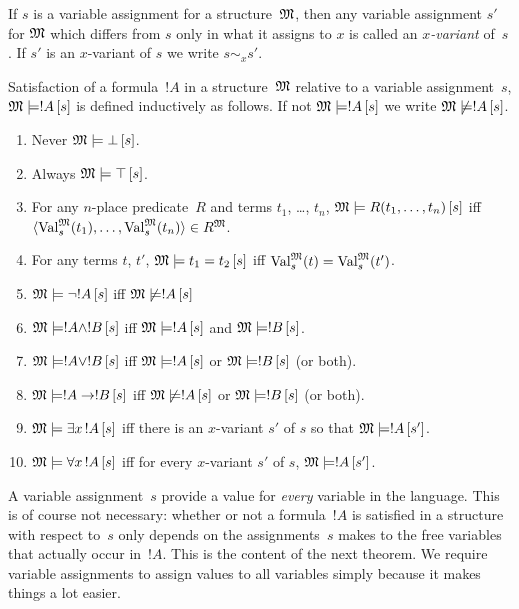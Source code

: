\documentclass[open-logic-section]{subfiles}
\begin{document}
\begin{defn}[$x$-Variant]
If $s$ is a variable assignment for a structure~$\mathfrak M$, then any
variable assignment $s'$ for $\mathfrak M$ which differs from $s$ only
in what it assigns to $x$ is called an \emph{$x$-variant} of~$s$.  If
$s'$ is an $x$-variant of $s$ we write $s \sim_x s'$.
\end{defn}

\begin{defn}[Satisfaction]
Satisfaction of a formula~$!A$ in a structure~$\mathfrak M$ relative to
a variable assignment~$s$, $\Sat{M}{!A}[s]$ is defined inductively as
follows. If not $\Sat{M}{!A}[s]$ we write $\Sat/{M}{!A}[s]$.
\begin{enumerate}
\item Never $\Sat{M}{\lfalse}[s]$.
\item Always $\Sat{M}{\ltrue}[s]$.
\item For any $n$-place predicate~$R$ and terms $t_1$, \dots, $t_n$,
  $\Sat{M}{\Atom{R}{t_1, \dots, t_n}}[s]$ iff $\langle \Value{t_1}{M}[s],
  \dots, \Value{t_n}{M}[s] \rangle \in \Assign{R}{M}$.
\item For any terms $t$, $t'$, $\Sat{M}{t_1 = t_2}[s]$ iff
  $\Value{t}{M}[s] = \Value{t'}{M}[s]$.
\item $\Sat{M}{\lnot !A}[s]$ iff $\Sat/{M}{!A}[s]$
\item $\Sat{M}{!A \land !B}[s]$ iff $\Sat{M}{!A}[s]$ and $\Sat{M}{!B}[s]$.
\item $\Sat{M}{!A \lor !B}[s]$ iff $\Sat{M}{!A}[s]$ or
  $\Sat{M}{!B}[s]$ (or both).
\item $\Sat{M}{!A \lif !B}[s]$ iff $\Sat/{M}{!A}[s]$ or
  $\Sat{M}{!B}[s]$ (or both).
\item $\Sat{M}{\lexists[x][!A]}[s]$ iff there is an $x$-variant $s'$
  of $s$ so that $\Sat{M}{!A}[s']$.
\item $\Sat{M}{\lforall[x][!A]}[s]$ iff for every $x$-variant $s'$ of
  $s$, $\Sat{M}{!A}[s']$.
\end{enumerate}
\end{defn}

\begin{wordy}
A variable assignment~$s$ provide a value for \emph{every} variable in
the language. This is of course not necessary: whether or not a
formula~$!A$ is satisfied in a structure with respect to~$s$ only
depends on the assignments~$s$ makes to the free variables that
actually occur in~$!A$.  This is the content of the next theorem.  We
require variable assignments to assign values to all variables simply
because it makes things a lot easier.
\end{wordy}
\end{document}
